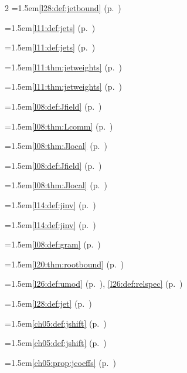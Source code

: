 \begin{multicols}{2}
\hangindent=1.5em\quad \ref{l28:def:jetbound} (p.~\pageref{l28:def:jetbound})\par
\hangindent=1.5em\quad \ref{l11:def:jets} (p.~\pageref{l11:def:jets})\par
\hangindent=1.5em\quad \ref{l11:def:jets} (p.~\pageref{l11:def:jets})\par
\hangindent=1.5em\quad \ref{l11:thm:jetweights} (p.~\pageref{l11:thm:jetweights})\par
\hangindent=1.5em\quad \ref{l11:thm:jetweights} (p.~\pageref{l11:thm:jetweights})\par
\hangindent=1.5em\quad \ref{l08:def:Jfield} (p.~\pageref{l08:def:Jfield})\par
\hangindent=1.5em\quad \ref{l08:thm:Lcomm} (p.~\pageref{l08:thm:Lcomm})\par
\hangindent=1.5em\quad \ref{l08:thm:Jlocal} (p.~\pageref{l08:thm:Jlocal})\par
\hangindent=1.5em\quad \ref{l08:def:Jfield} (p.~\pageref{l08:def:Jfield})\par
\hangindent=1.5em\quad \ref{l08:thm:Jlocal} (p.~\pageref{l08:thm:Jlocal})\par
\hangindent=1.5em\quad \ref{l14:def:jinv} (p.~\pageref{l14:def:jinv})\par
\hangindent=1.5em\quad \ref{l14:def:jinv} (p.~\pageref{l14:def:jinv})\par
\hangindent=1.5em\quad \ref{l08:def:gram} (p.~\pageref{l08:def:gram})\par
\hangindent=1.5em\quad \ref{l20:thm:rootbound} (p.~\pageref{l20:thm:rootbound})\par
\hangindent=1.5em\quad \ref{l26:def:umod} (p.~\pageref{l26:def:umod}), \ref{l26:def:relspec} (p.~\pageref{l26:def:relspec})\par
\hangindent=1.5em\quad \ref{l28:def:jet} (p.~\pageref{l28:def:jet})\par
\hangindent=1.5em\quad \ref{ch05:def:jshift} (p.~\pageref{ch05:def:jshift})\par
\hangindent=1.5em\quad \ref{ch05:def:jshift} (p.~\pageref{ch05:def:jshift})\par
\hangindent=1.5em\quad \ref{ch05:prop:jcoeffs} (p.~\pageref{ch05:prop:jcoeffs})\par

\end{multicols}
